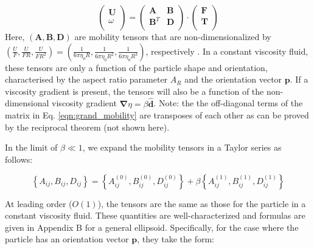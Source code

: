 \documentclass{jfm}
\begin{document}
\begin{equation} \label{eqn:grand_mobility}
\left(\begin{array}{c}
\boldsymbol{U} \\
\omega \\
\end{array}\right)=\left(\begin{array}{cc}
\boldsymbol{A} & \boldsymbol{B}   \\
\boldsymbol{B}^{T} & \boldsymbol{D}  \\
\end{array}\right) \cdot \left(\begin{array}{c}
\boldsymbol{F} \\
\boldsymbol{T} \\
\end{array}\right)
\end{equation}
Here, $(\boldsymbol{A},\boldsymbol{B},\boldsymbol{D})$ are mobility tensors that are non-dimensionalized by $\left(\frac{U}{F},\frac{U}{FR},\frac{U}{FR^2}\right) = \left( \frac{1}{6\pi \eta_0 R}, \frac{1}{6\pi \eta_0 R^2}, \frac{1}{6\pi \eta_0 R^3}\right)$, respectively .  In a constant viscosity fluid, these tensors are only a function of the particle shape and orientation, characterised by the aspect ratio parameter $A_R$ and the orientation vector $\boldsymbol{p}$. If a viscosity gradient is present, the tensors will also be a function of the non-dimensional viscosity gradient $\boldsymbol{\nabla}\eta = \beta \boldsymbol{\hat{d}}$.  Note:  the the off-diagonal terms of the matrix in Eq. \eqref{eqn:grand_mobility} are transposes of each other as can be proved by the reciprocal theorem (not shown here).


In the limit of $\beta \ll 1$, we expand the mobility tensors in a Taylor series as follows:

\begin{equation}
    \left\{{A}_{ij},{B}_{ij},{D}_{ij}\right\} =\left\{{A}^{(0)}_{ij},{B}^{(0)}_{ij},{D}^{(0)}_{ij}\right\}+\beta\left\{{A}^{(1)}_{ij},{B}^{(1)}_{ij},{D}^{(1)}_{ij}\right\}
\end{equation}

At leading order ($O(1)$), the tensors are the same as those for the particle in a constant viscosity fluid.  These quantities are well-characterized and formulas are given in Appendix B for a general ellipsoid.  Specifically, for the case where the particle has an orientation vector $\boldsymbol{p}$, they take the form:


\end{document}
